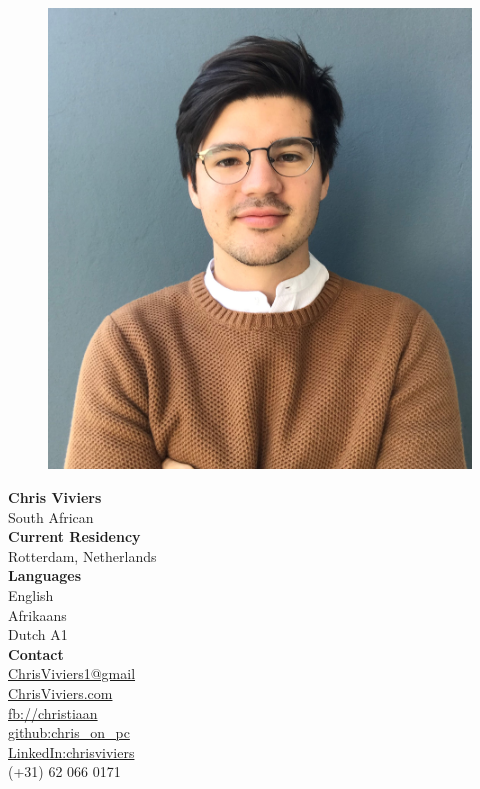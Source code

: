 \documentclass[a4paper,12pt,final]{memoir}
\newcommand{\CVItem}[1]
	{\textbf{\color{RoyalBlue} #1}}
\begin{document}
\begin{figure}
	\hfill
	\includegraphics[width=0.7\columnwidth ]{picture}
	\vspace{-5cm}
\end{figure}


\begin{flushright}\small
	
	\CVItem{Chris Viviers}\\
	South African\\
	\vspace{0.5cm}	
	\CVItem{Current Residency}\\
	Rotterdam, Netherlands\\
	\vspace{0.5cm}
	\CVItem{Languages}\\
	English \\
	Afrikaans\\
	Dutch A1 \\
	\vspace{0.5cm}	
	\CVItem{Contact}\\	
	\href{mailto:ChrisViviers1@gmail.com}{ChrisViviers1@gmail}\\
	\href{http://chrisviviers.com/}{ChrisViviers.com}\\
	\href{https://www.facebook.com/christiaan.viviers.1}{fb://christiaan}\\
	\href{https://github.com/Chris-On-PC}{github:chris\_on\_pc}\\
	\href{https://www.linkedin.com/in/chrisviviers}{LinkedIn:chrisviviers}\\
	(+31) 62 066 0171
	
	
\end{flushright}\normalsize
\end{document}
